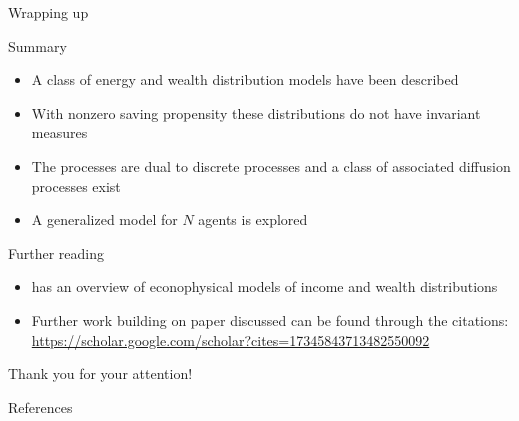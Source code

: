\documentclass[9pt]{beamer}
\begin{document}
\begin{frame}{Wrapping up}
  \begin{block}{Summary}
    \begin{itemize}
    \item A class of energy and wealth distribution models have been described
    \item With nonzero saving propensity these distributions do not have invariant measures
    \item The processes are dual to discrete processes and a class of associated diffusion processes exist
    \item A generalized model for $N$ agents is explored
    \end{itemize}
  \end{block}
  \begin{block}{Further reading}
    \begin{itemize}
    \item {} has an overview of econophysical models of income and wealth distributions
    \item Further work building on paper discussed can be found through the citations: \url{https://scholar.google.com/scholar?cites=17345843713482550092}
    \end{itemize}
  \end{block}
  \pause
  \begin{center}
  \huge{
  Thank you for your attention!
  }
  \end{center}
\end{frame}

\begin{frame}[allowframebreaks]{References}

%   
%   
  \printbibliography
\end{frame}
\end{document}
